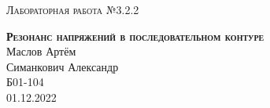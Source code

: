 \documentclass[12pt,a4paper]{extreport}
\begin{document}
	
	\begin{center}
		\large
		\textsc{Лабораторная работа №3.2.2}
		
		\LARGE
		\textbf{\textsc{Резонанс напряжений в последовательном контуре}}
		\\[5mm]
		
		\large
		Маслов Артём\\
		Симанкович Александр\\
		Б01-104
		\\[3mm]
		01.12.2022
	\end{center}
	
	
	
	
		
	
	
	
	
	
	
	
	
\end{document}
